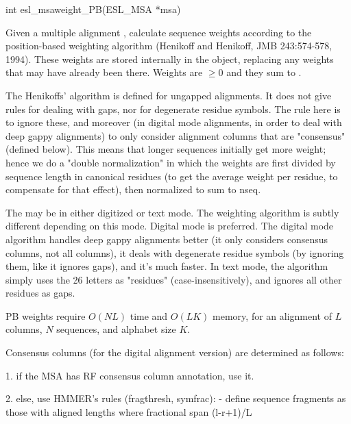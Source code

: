 \begin{sreapi}
\hypertarget{func:esl_msaweight_PB()}
{\item[int esl\_msaweight\_PB(ESL\_MSA *msa)]}

Given a multiple alignment , calculate sequence
weights according to the position-based weighting
algorithm (Henikoff and Henikoff, JMB 243:574-578,
1994). These weights are stored internally in the 
object, replacing any weights that may have already been
there. Weights are $\geq 0$ and they sum to .

The Henikoffs' algorithm is defined for ungapped
alignments. It does not give rules for dealing with
gaps, nor for degenerate residue symbols. The rule here
is to ignore these, and moreover (in digital mode
alignments, in order to deal with deep gappy alignments)
to only consider alignment columns that are "consensus"
(defined below).  This means that longer sequences
initially get more weight; hence we do a "double
normalization" in which the weights are first divided by
sequence length in canonical residues (to get the
average weight per residue, to compensate for that
effect), then normalized to sum to nseq.

The  may be in either digitized or text mode. The
weighting algorithm is subtly different depending on
this mode. Digital mode is preferred. The digital mode
algorithm handles deep gappy alignments better (it only
considers consensus columns, not all columns), it deals
with degenerate residue symbols (by ignoring them, like
it ignores gaps), and it's much faster. In text mode,
the algorithm simply uses the 26 letters as "residues"
(case-insensitively), and ignores all other residues as
gaps.

PB weights require $O(NL)$ time and $O(LK)$ memory, for
an alignment of $L$ columns, $N$ sequences, and alphabet
size $K$.

Consensus columns (for the digital alignment version)
are determined as follows:

1. if the MSA has RF consensus column annotation, use it.

2. else, use HMMER's rules (fragthresh, symfrac):
- define sequence fragments as those with aligned
lengths where fractional span (l-r+1)/L 
\end{sreapi}
